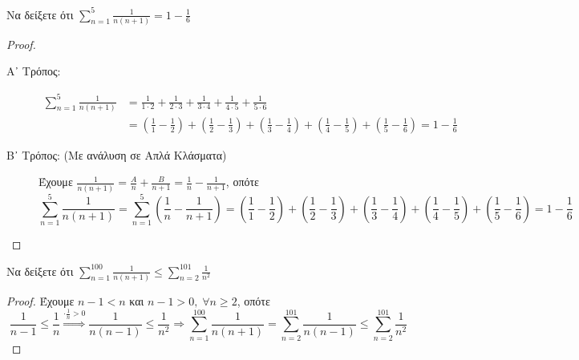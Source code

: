 \documentclass[main.tex]{subfiles}
\begin{document}
\begin{example}
    Να δείξετε ότι $ \sum_{n=1}^{5} \frac{1}{n(n+1)} = 1 - \frac{1}{6}  $
\end{example}

\begin{proof}
\item {}
    \begin{description}
        \item [Α᾽ Τρόπος:]
            \begin{align*}
                \sum_{n=1}^{5} \frac{1}{n(n+1)} 
        &= \frac{1}{1\cdot 2} + \frac{1}{2 \cdot 3} + \frac{1}{3 \cdot 4} 
        + \frac{1}{4 \cdot 5} + \frac{1}{5 \cdot 6} \\
        &= \left(\frac{1}{1} - \frac{1}{2}\right) + \left(\frac{1}{2} 
        - \frac{1}{3} \right) + \left(\frac{1}{3} - \frac{1}{4}\right) 
        + \left(\frac{1}{4} - \frac{1}{5}\right) +
        \left(\frac{1}{5} - \frac{1}{6}\right)  = 1 - \frac{1}{6}
            \end{align*}
        \item [Β᾽ Τρόπος: (Με ανάλυση σε Απλά Κλάσματα)]
            Έχουμε $ \frac{1}{n(n+1)} = \frac{A}{n} + \frac{B}{n+1} = 
            \frac{1}{n} - \frac{1}{n+1}$, οπότε
            \begin{equation*}
                \sum_{n=1}^{5} \frac{1}{n(n+1)} = \sum_{n=1}^{5} \left(\frac{1}{n} - 
                \frac{1}{n+1}\right)    
                = \left(\frac{1}{1} - \frac{1}{2}\right) + \left(\frac{1}{2} 
                - \frac{1}{3} \right) + \left(\frac{1}{3} - \frac{1}{4}\right) 
                + \left(\frac{1}{4} - \frac{1}{5}\right) +
                \left(\frac{1}{5} - \frac{1}{6}\right)  = 1 - \frac{1}{6}
            \end{equation*} 
    \end{description}
\end{proof}


\begin{example}
    Να δείξετε ότι $ \sum_{n=1}^{100} \frac{1}{n(n+1)} \leq \sum_{n=2}^{101} 
    \frac{1}{n^{2}} $
\end{example}
\begin{proof}
\item {} 
    Έχουμε $ n-1 < n $ και $ n-1 > 0, \; \forall n \geq 2 $, οπότε
    \[
        \frac{1}{n-1} \leq \frac{1}{n} \overset{\cdot \frac{1}{n} >0}{\Rightarrow}
        \frac{1}{n(n-1)} \leq \frac{1}{n^{2}} \Rightarrow \sum_{n=1}^{100} 
        \frac{1}{n(n+1)} = \sum_{n=2}^{101} \frac{1}{n(n-1)} \leq \sum_{n=2}^{101} 
        \frac{1}{n^{2}} 
    \] 
\end{proof}
\end{document}
